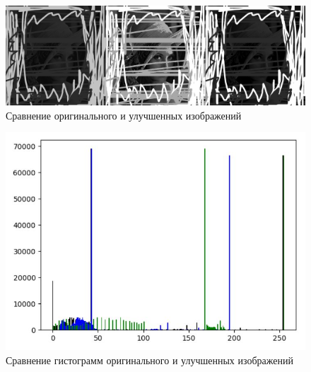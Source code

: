 \begin{figure}[H]
	\begin{center}
		\includegraphics[scale=0.3]{rez2.jpg}
		\caption{Сравнение оригинального и улучшенных изображений} 
		\label{pic:hist_eq} %
	\end{center}
\end{figure}
\begin{figure}[H]
	\begin{center}
		\includegraphics[scale=0.7]{hist_last.JPG}
		\caption{Сравнение гистограмм оригинального и улучшенных изображений} 
		\label{pic:hist_eq} %
	\end{center}
\end{figure}

